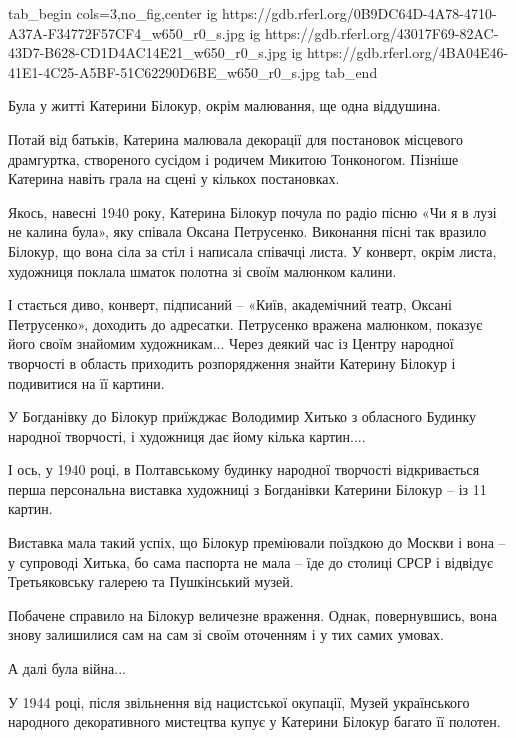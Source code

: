 \ifcmt
tab_begin cols=3,no_fig,center
  ig https://gdb.rferl.org/0B9DC64D-4A78-4710-A37A-F34772F57CF4_w650_r0_s.jpg
	ig https://gdb.rferl.org/43017F69-82AC-43D7-B628-CD1D4AC14E21_w650_r0_s.jpg
	ig https://gdb.rferl.org/4BA04E46-41E1-4C25-A5BF-51C62290D6BE_w650_r0_s.jpg
tab_end
\fi


Була у житті Катерини Білокур, окрім малювання, ще одна віддушина.

Потай від батьків, Катерина малювала декорації для постановок місцевого
драмгуртка, створеного сусідом і родичем Микитою Тонконогом. Пізніше Катерина
навіть грала на сцені у кількох постановках.


Якось, навесні 1940 року, Катерина Білокур почула по радіо пісню «Чи я в лузі
не калина була», яку співала Оксана Петрусенко. Виконання пісні так вразило
Білокур, що вона сіла за стіл і написала співачці листа. У конверт, окрім
листа, художниця поклала шматок полотна зі своїм малюнком калини.

І стається диво, конверт, підписаний – «Київ, академічний театр, Оксані
Петрусенко», доходить до адресатки. Петрусенко вражена малюнком, показує його
своїм знайомим художникам... Через деякий час із Центру народної творчості в
область приходить розпорядження знайти Катерину Білокур і подивитися на її
картини.

У Богданівку до Білокур приїжджає Володимир Хитько з обласного Будинку народної
творчості, і художниця дає йому кілька картин....

І ось, у 1940 році, в Полтавському будинку народної творчості відкривається
перша персональна виставка художниці з Богданівки Катерини Білокур – із 11
картин.

Виставка мала такий успіх, що Білокур преміювали поїздкою до Москви і вона – у
супроводі Хитька, бо сама паспорта не мала – їде до столиці СРСР і відвідує
Третьяковську галерею та Пушкінський музей.

Побачене справило на Білокур величезне враження. Однак, повернувшись, вона
знову залишилися сам на сам зі своїм оточенням і у тих самих умовах.

А далі була війна...

У 1944 році, після звільнення від нацистської окупації, Музей українського
народного декоративного мистецтва купує у Катерини Білокур багато її полотен.


